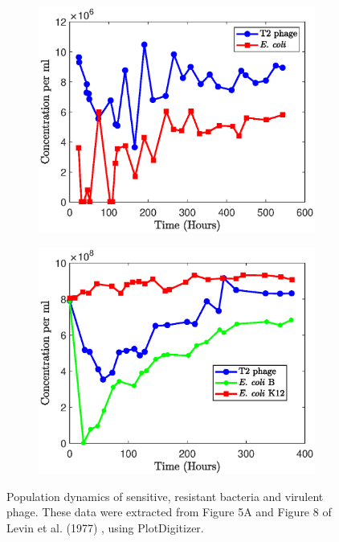 \begin{figure}[t]
\begin{subfigure}[t]{0.45\textwidth}
\centering
\includegraphics[scale=0.55]{L3.eps}

\end{subfigure}\hfill
\begin{subfigure}[t]{0.45\textwidth}
\includegraphics[scale=0.55]{L4.eps}
\end{subfigure}\hfill
\caption[Population dynamics of sensitive, resistant bacteria and virulent phage.]{Population dynamics of sensitive, resistant bacteria and virulent phage. These data were extracted from Figure 5A and Figure 8 of Levin et al. (1977) \cite{levin_resource-limited_1977}, using PlotDigitizer.}
\label{fig:levin}
\end{figure}
